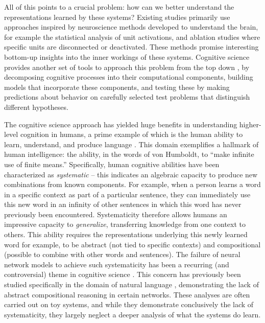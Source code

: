 All of this points to a crucial problem: how can we better understand the representations learned by these systems? Existing studies \citep[e.g.,][]{karpathy2015visualizing, li2015visualizing, yosinski2015understanding, zeiler2014visualizing} primarily use approaches inspired by neuroscience methods developed to understand the brain, for example the statistical analysis of unit activations, and ablation studies where specific units are disconnected or deactivated. These methods promise interesting bottom-up insights into the inner workings of these systems. Cognitive science provides another set of tools to approach this problem from the top down \citep{ritter17, kadar2017representation, mccoy2019right}, by decomposing cognitive processes into their computational components, building models that incorporate these components, and testing these by making predictions about behavior on carefully selected test problems that distinguish different hypotheses. 

The cognitive science approach has yielded huge benefits in understanding higher-level cognition in humans, a prime example of which is the human ability to learn, understand, and produce language \citep{chomsky2002syntactic, linzen2019can}. This domain exemplifies a hallmark of human intelligence: the ability, in the words of von Humboldt, to ``make infinite use of finite means.'' Specifically, human cognitive abilities have been characterized as \textit{systematic} \citep{fodor88, lake2019human} -- this indicates an algebraic capacity to produce new combinations from known components. For example, when a person learns a word in a specific context as part of a particular sentence, they can immediately use this new word in an infinity of other sentences in which this word has never previously been encountered. Systematicity therefore allows humans an impressive capacity to \textit{generalize}, transferring knowledge from one context to others. This ability requires the representations underlying this newly learned word for example, to be abstract (not tied to specific contexts) and compositional (possible to combine with other words and sentences). The failure of neural network models to achieve such systematicity has been a recurring (and controversial) theme in cognitive science \citep{fodor88,lake18}. This concern has previously been studied specifically in the domain of natural language \citep{lake17, gershman15, belinkov2019analysis}, demonstrating the lack of abstract compositional reasoning in certain networks. These analyses are often carried out on toy systems, and while they demonstrate conclusively the lack of systematicity, they largely neglect a deeper analysis of what the systems do learn. 

